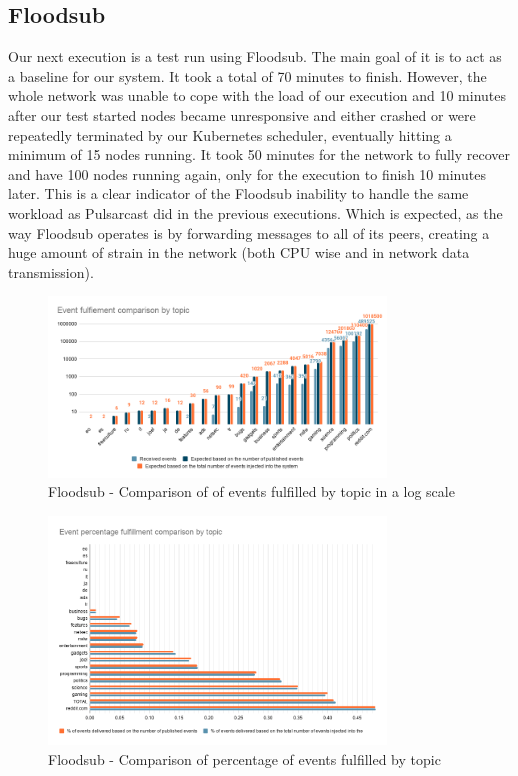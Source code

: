 \subsection{Floodsub}\label{subsec:floodsub}

Our next execution is a test run using Floodsub. The main goal of it is to act
as a baseline for our system. It took a total of 70 minutes to finish. However,
the whole network was unable to cope with the load of our execution and 10
minutes after our test started nodes became unresponsive and either crashed or
were repeatedly terminated by our Kubernetes scheduler, eventually hitting a
minimum of 15 nodes running. It took 50 minutes for the network to fully
recover and have 100 nodes running again, only for the execution to finish 10
minutes later. This is a clear indicator of the Floodsub inability to handle
the same workload as Pulsarcast did in the previous executions. Which is
expected, as the way Floodsub operates is by forwarding messages to all of its
peers, creating a huge amount of strain in the network (both CPU wise and in
network data transmission).

\begin{figure}[!htb]
  \centering
  \includegraphics[width=0.8\textwidth]{img/graph-floodsub-event-fulfillment-comparison.png}
  \caption{Floodsub - Comparison of of events fulfilled by topic in a log scale}
  \label{fig:graph-floodsub-event-fulfillment-comparison}
\end{figure}

\begin{figure}[!htb]
  \centering
  \includegraphics[width=0.8\textwidth]{img/graph-floodsub-event-percentage-fulfillment-comparison.png}
  \caption{Floodsub - Comparison of percentage of events fulfilled by topic}
  \label{fig:graph-floodsub-event-percentage-fulfillment-comparison}
\end{figure}

